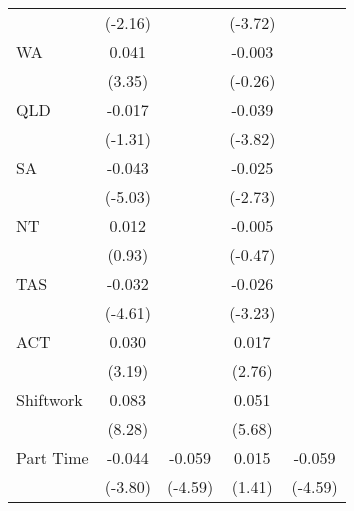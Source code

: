 {\begin{tabular}{l*{4}{c}}
                    &     (-2.16)         &                     &     (-3.72)         &                     \\
[1em]
WA                  &       0.041\sym{***}&                     &      -0.003         &                     \\
                    &      (3.35)         &                     &     (-0.26)         &                     \\
[1em]
QLD                 &      -0.017         &                     &      -0.039\sym{***}&                     \\
                    &     (-1.31)         &                     &     (-3.82)         &                     \\
[1em]
SA                  &      -0.043\sym{***}&                     &      -0.025\sym{**} &                     \\
                    &     (-5.03)         &                     &     (-2.73)         &                     \\
[1em]
NT                  &       0.012         &                     &      -0.005         &                     \\
                    &      (0.93)         &                     &     (-0.47)         &                     \\
[1em]
TAS                 &      -0.032\sym{***}&                     &      -0.026\sym{**} &                     \\
                    &     (-4.61)         &                     &     (-3.23)         &                     \\
[1em]
ACT                 &       0.030\sym{**} &                     &       0.017\sym{**} &                     \\
                    &      (3.19)         &                     &      (2.76)         &                     \\
[1em]
Shiftwork           &       0.083\sym{***}&                     &       0.051\sym{***}&                     \\
                    &      (8.28)         &                     &      (5.68)         &                     \\
[1em]
Part Time           &      -0.044\sym{***}&      -0.059\sym{***}&       0.015         &      -0.059\sym{***}\\
                    &     (-3.80)         &     (-4.59)         &      (1.41)         &     (-4.59)         \\

\end{tabular}}
